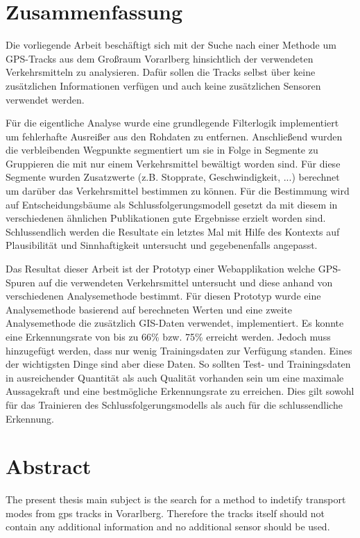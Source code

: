 \section*{Zusammenfassung}

Die vorliegende Arbeit beschäftigt sich mit der Suche nach einer Methode um GPS-Tracks  aus dem Großraum Vorarlberg hinsichtlich der verwendeten Verkehrsmitteln zu analysieren. Dafür sollen die Tracks selbst über keine zusätzlichen Informationen verfügen und auch keine zusätzlichen Sensoren verwendet werden.

Für die eigentliche Analyse wurde eine grundlegende Filterlogik implementiert um fehlerhafte Ausreißer aus den Rohdaten zu entfernen. Anschließend wurden die verbleibenden Wegpunkte segmentiert um sie in Folge in Segmente zu Gruppieren die mit nur einem Verkehrsmittel bewältigt worden sind. Für diese Segmente wurden Zusatzwerte (z.B. Stopprate, Geschwindigkeit, ...) berechnet um darüber das Verkehrsmittel bestimmen zu können. Für die Bestimmung wird auf Entscheidungsbäume als Schlussfolgerungsmodell gesetzt da mit diesem in verschiedenen ähnlichen Publikationen gute Ergebnisse erzielt worden sind. Schlussendlich werden die Resultate ein letztes Mal mit Hilfe des Kontexts auf Plausibilität und Sinnhaftigkeit untersucht und gegebenenfalls angepasst.

Das Resultat dieser Arbeit ist der Prototyp einer Webapplikation welche GPS-Spuren auf die verwendeten Verkehrsmittel untersucht und diese anhand von verschiedenen Analysemethode bestimmt. Für diesen Prototyp wurde eine Analysemethode basierend auf berechneten Werten und eine zweite Analysemethode die zusätzlich GIS-Daten verwendet, implementiert. Es konnte eine Erkennungsrate von bis zu 66\% bzw. 75\% erreicht werden. Jedoch muss hinzugefügt werden, dass nur wenig Trainingsdaten zur Verfügung standen. Eines der wichtigsten Dinge sind aber diese Daten. So sollten Test- und Trainingsdaten in ausreichender Quantität als auch Qualität vorhanden sein um eine maximale Aussagekraft und eine bestmögliche Erkennungsrate zu erreichen. Dies gilt sowohl für das Trainieren des Schlussfolgerungsmodells als auch für die schlussendliche Erkennung.
\afterpage{\blankpage}
\newpage

\section*{Abstract}

The present thesis main subject is the search for a method to indetify transport modes from gps tracks in Vorarlberg. Therefore the tracks itself should not contain any additional information and no additional sensor should be used.

